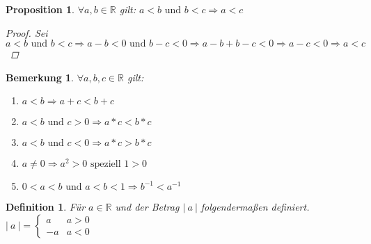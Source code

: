 \documentclass[a4paper,titlepage,oneside]{article}
\def\R{\ensuremath{\mathbb{R}} }
\def\fa{\ensuremath{\forall}}
\newcommand{\abs}[1]{\ensuremath{\left|\:#1\:\right|}}
\theoremstyle{thmstyle}
\newtheorem{prop}[satz]{Proposition}
\newtheorem{defi}[satz]{Definition}
\newtheorem{bem}[satz]{Bemerkung}
\begin{document}
\begin{prop}
\(\fa a, b \in \R \) gilt: \(a < b \text{ und } b < c \Rightarrow a < c\)
\begin{proof}
Sei \( a < b \text{ und } b < c \Rightarrow a - b < 0  \text{ und } b - c < 0 \Rightarrow a - b + b - c < 0 \Rightarrow a - c < 0 \Rightarrow a < c\)
\end{proof}
\end{prop}

\begin{bem}
\(\fa a, b, c \in \R\) gilt:
\begin{enumerate}[label=\alph*)]
	\item \(a < b \Rightarrow a + c < b + c\)
	\item \(a < b \text{ und } c > 0 \Rightarrow a * c < b * c\)
	\item \(a < b \text{ und } c < 0 \Rightarrow a * c > b * c\)
	\item \(a \ne 0 \Rightarrow a^2 > 0 \text{ speziell } 1 > 0\)
	\item \(0 < a < b \text{ und } a < b < 1 \Rightarrow b^{-1} < a^{-1}\)
\end{enumerate}
\end{bem}

\begin{defi}
Für \(a \in \R\) und der Betrag \abs{a} folgendermaßen definiert.
$\abs{a} = \begin{cases}
		 a 	& a > 0\\
		-a 	& a < 0  \end{cases}$
\end{defi}
\end{document}
